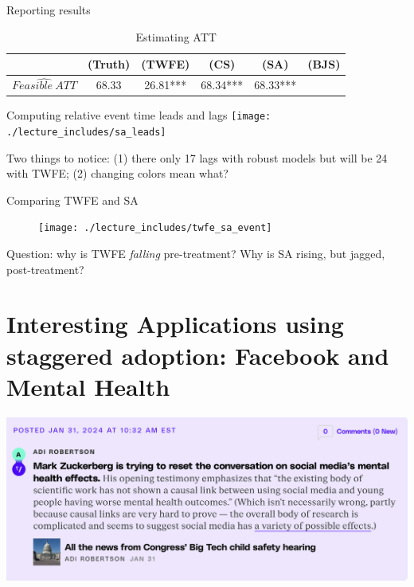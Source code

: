 \documentclass{beamer}
\begin{document}
\begin{frame}{Reporting results}
\begin{table}[htbp]\centering
\small
\caption{Estimating ATT}
\begin{center}
\begin{tabular}{l*{5}{c}}
\hline
\multicolumn{1}{l}{\textbf{}}&
\multicolumn{1}{c}{\textbf{(Truth)}}&
\multicolumn{1}{c}{\textbf{(TWFE)}}&
\multicolumn{1}{c}{\textbf{(CS)}}&
\multicolumn{1}{c}{\textbf{(SA)}}&
\multicolumn{1}{c}{\textbf{(BJS)}}\\
\hline
$\widehat{Feasible\ ATT}$  & 68.33    & 26.81*** & 68.34*** & 68.33***&\\
\hline
\end{tabular}
\end{center}
\end{table}

\end{frame}

\begin{frame}{Computing relative event time leads and lags }
             \texttt{[image: ./lecture\_includes/sa\_leads]}

Two things to notice: (1) there only 17 lags with robust models but will be 24 with TWFE; (2) changing colors mean what?

\end{frame}

\begin{frame}{Comparing TWFE and SA }

\begin{figure}
\begin{center}
             \texttt{[image: ./lecture\_includes/twfe\_sa\_event]}
\end{center}
\end{figure}

Question: why is TWFE \emph{falling} pre-treatment?  Why is SA rising, but jagged, post-treatment?

\end{frame}

\section{Interesting Applications using staggered adoption: Facebook and Mental Health}




\begin{frame}
\begin{center}
\includegraphics[scale=0.35]{./lecture_includes/facebook_quote}
\end{center}
\end{frame}
\end{document}
